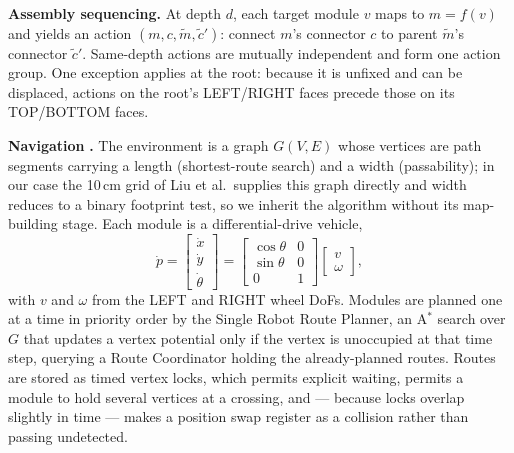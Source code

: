 \documentclass[11pt,a4paper]{article}
\begin{document}
\medskip
\noindent\textbf{Assembly sequencing.} At depth $d$, each target module $v$
maps to $m = f(v)$ and yields an action $(m, c, \tilde{m}, \tilde{c}')$:
connect $m$'s connector $c$ to parent $\tilde{m}$'s connector $\tilde{c}'$.
Same-depth actions are mutually independent and form one action group. One
exception applies at the root: because it is unfixed and can be displaced,
actions on the root's LEFT/RIGHT faces precede those on its TOP/BOTTOM faces.

\medskip
\noindent\textbf{Navigation} \cite{binder2019,binder2017}\textbf{.} The
environment is a graph $G(V, E)$ whose vertices are path segments carrying a
length (shortest-route search) and a width (passability); in our case the
10\,cm grid of Liu et al.\ supplies this graph directly and width reduces to a
binary footprint test, so we inherit the algorithm without its map-building
stage. Each module is a differential-drive vehicle,
\begin{equation}
  \dot{p} = \begin{bmatrix} \dot{x} \\ \dot{y} \\ \dot{\theta} \end{bmatrix}
          = \begin{bmatrix} \cos\theta & 0 \\ \sin\theta & 0 \\ 0 & 1
            \end{bmatrix}
            \begin{bmatrix} v \\ \omega \end{bmatrix},
\end{equation}
with $v$ and $\omega$ from the LEFT and RIGHT wheel DoFs. Modules are planned
one at a time in priority order by the Single Robot Route Planner, an A$^*$
search over $G$ that updates a vertex potential only if the vertex is
unoccupied at that time step, querying a Route Coordinator holding the
already-planned routes. Routes are stored as timed vertex locks, which permits
explicit waiting, permits a module to hold several vertices at a crossing, and
--- because locks overlap slightly in time --- makes a position swap register as
a collision rather than passing undetected.
\end{document}
